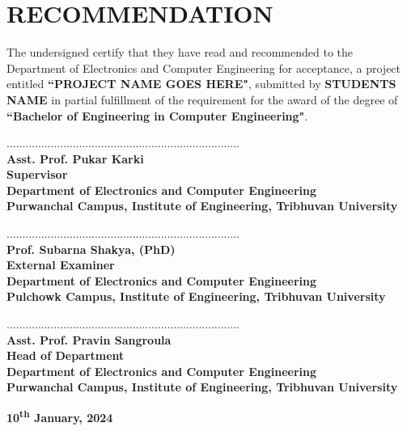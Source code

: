 \chapter*{RECOMMENDATION}
The undersigned certify that they have read and recommended to the Department of
Electronics and Computer Engineering for acceptance, a project entitled \textbf{``PROJECT NAME GOES HERE"}, submitted by \textbf{STUDENTS NAME} in partial fulfillment of the requirement for the award of the degree of \textbf{``Bachelor of Engineering in Computer Engineering"}.\par
        \vspace{1cm}
..........................................................................\\
\textbf{Asst. Prof. Pukar Karki\\
Supervisor\\
Department of Electronics and Computer Engineering\\
Purwanchal Campus, Institute of Engineering, Tribhuvan University}\par
        \vspace{1cm}
..........................................................................\\
\textbf{Prof. Subarna Shakya, (PhD)\\
External Examiner \\
Department of Electronics and Computer Engineering\\
Pulchowk Campus, Institute of Engineering, Tribhuvan University}\par
        \vspace{1cm}
..........................................................................\\
\textbf{
Asst. Prof. Pravin Sangroula\\ 
Head of Department \\
Department of Electronics and Computer Engineering\\Purwanchal Campus, Institute of Engineering, Tribhuvan University}\par
\vspace{2.5cm}

\begin{center}
\textbf{10\textsuperscript{th} January, 2024}
\end{center}
\newpage

